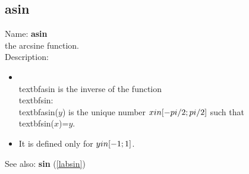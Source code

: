 \subsection{asin}
\label{labasin}
\noindent Name: \textbf{asin}\\
the arcsine function.\\
\noindent Description: \begin{itemize}

\item \\textbf{asin} is the inverse of the function \\textbf{sin}: \\textbf{asin}($y$) is the unique number \n   $x \\in [-\\pi/2; \\pi/2]$ such that \\textbf{sin}($x$)=$y$.\n
\item It is defined only for $y \\in [-1;1]$.\n\end{itemize}
See also: \textbf{sin} (\ref{labsin})
